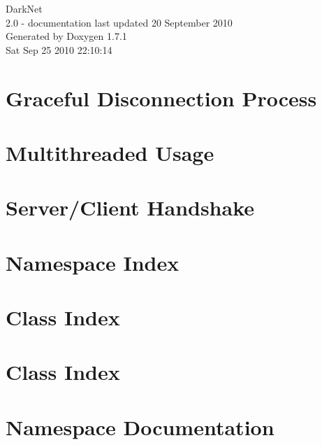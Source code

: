 \documentclass[a4paper]{book}
\begin{document}
\hypersetup{pageanchor=false}
\begin{titlepage}
\vspace*{7cm}
\begin{center}
{\Large DarkNet \\[1ex]\large 2.0 -\/ documentation last updated 20 September 2010 }\\
\vspace*{1cm}
{\large Generated by Doxygen 1.7.1}\\
\vspace*{0.5cm}
{\small Sat Sep 25 2010 22:10:14}\\
\end{center}
\end{titlepage}
\clearemptydoublepage
{}
\tableofcontents
\clearemptydoublepage
{}
\hypersetup{pageanchor=true}
\chapter{Graceful Disconnection Process}
\label{gracefulDisconnectPage}
\hypertarget{gracefulDisconnectPage}{}

\chapter{Multithreaded Usage}
\label{multithreadingPage}
\hypertarget{multithreadingPage}{}

\chapter{Server/Client Handshake}
\label{handshakePage}
\hypertarget{handshakePage}{}

\chapter{Namespace Index}

\chapter{Class Index}

\chapter{Class Index}

\chapter{Namespace Documentation}





\end{document}
